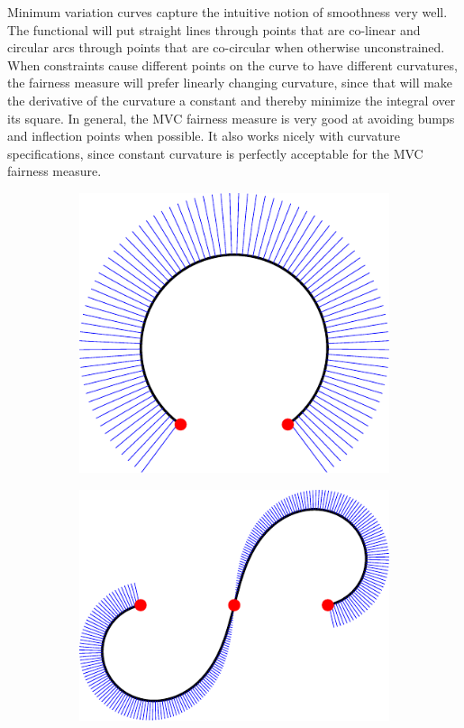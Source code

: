 \documentclass[a4paper]{article}
\begin{document}
				Minimum variation curves capture the intuitive notion of smoothness very well. The functional will put straight lines through points that are co-linear and circular arcs through points that are co-circular when otherwise unconstrained. When constraints cause different points on the curve to have different curvatures, the fairness measure will prefer linearly changing curvature, since that will make the derivative of the curvature a constant and thereby minimize the integral over its square. In general, the MVC fairness measure is very good at avoiding bumps and inflection points when possible. It also works nicely with curvature specifications, since constant curvature is perfectly acceptable for the MVC fairness measure.

				\begin{figure}[htb]
					\centering
					\begin{subfigure}[b]{\textwidth / 3}
						\includegraphics[width=\textwidth]{content/output/fairness_mvc_1.pdf}
					\end{subfigure}%
					\begin{subfigure}[b]{\textwidth / 3}
						\includegraphics[width=\textwidth]{content/output/fairness_mvc_2.pdf}

\end{subfigure}
\end{figure}
\end{document}
